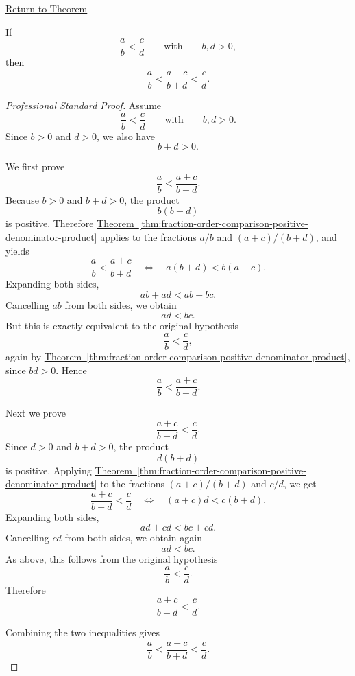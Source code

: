\newpage
{}
\label{prf:mediant-inequality}

\begin{remark*}[Return]
\hyperref[thm:mediant-inequality]{Return to Theorem}
\end{remark*}

\begin{theorem*}
If
\[
\frac{a}{b}<\frac{c}{d}
\qquad\text{with}\qquad b,d>0,
\]
then
\[
\frac{a}{b}<\frac{a+c}{b+d}<\frac{c}{d}.
\]
\end{theorem*}

\begin{proof}[Professional Standard Proof]
\LRAProofBodyStart
Assume
\[
\frac{a}{b}<\frac{c}{d}
\qquad\text{with}\qquad
b,d>0.
\]
Since $b>0$ and $d>0$, we also have
\[
b+d>0.
\]

We first prove
\[
\frac{a}{b}<\frac{a+c}{b+d}.
\]
Because $b>0$ and $b+d>0$, the product
\[
b(b+d)
\]
is positive.  Therefore
\hyperref[thm:fraction-order-comparison-positive-denominator-product]{Theorem~\ref*{thm:fraction-order-comparison-positive-denominator-product}}
applies to the fractions $a/b$ and $(a+c)/(b+d)$, and yields
\[
\frac{a}{b}<\frac{a+c}{b+d}
\quad\Longleftrightarrow\quad
a(b+d)<b(a+c).
\]
Expanding both sides,
\[
ab+ad<ab+bc.
\]
Cancelling $ab$ from both sides, we obtain
\[
ad<bc.
\]
But this is exactly equivalent to the original hypothesis
\[
\frac{a}{b}<\frac{c}{d},
\]
again by
\hyperref[thm:fraction-order-comparison-positive-denominator-product]{Theorem~\ref*{thm:fraction-order-comparison-positive-denominator-product}},
since $bd>0$.  Hence
\[
\frac{a}{b}<\frac{a+c}{b+d}.
\]

Next we prove
\[
\frac{a+c}{b+d}<\frac{c}{d}.
\]
Since $d>0$ and $b+d>0$, the product
\[
d(b+d)
\]
is positive.  Applying
\hyperref[thm:fraction-order-comparison-positive-denominator-product]{Theorem~\ref*{thm:fraction-order-comparison-positive-denominator-product}}
to the fractions $(a+c)/(b+d)$ and $c/d$, we get
\[
\frac{a+c}{b+d}<\frac{c}{d}
\quad\Longleftrightarrow\quad
(a+c)d<c(b+d).
\]
Expanding both sides,
\[
ad+cd<bc+cd.
\]
Cancelling $cd$ from both sides, we obtain again
\[
ad<bc.
\]
As above, this follows from the original hypothesis
\[
\frac{a}{b}<\frac{c}{d}.
\]
Therefore
\[
\frac{a+c}{b+d}<\frac{c}{d}.
\]

Combining the two inequalities gives
\[
\frac{a}{b}<\frac{a+c}{b+d}<\frac{c}{d}.
\]
\end{proof}

